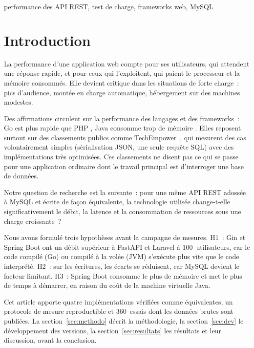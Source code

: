 \documentclass[conference,a4paper]{IEEEtran}
\begin{document}
\begin{IEEEkeywords}
performance des API REST, test de charge, frameworks web, MySQL
\end{IEEEkeywords}

\section{Introduction}
La performance d'une application web compte pour ses utilisateurs, qui
attendent une réponse rapide, et pour ceux qui l'exploitent, qui paient
le processeur et la mémoire consommés. Elle devient critique dans les
situations de forte charge~: pics d'audience, montée en charge
automatique, hébergement sur des machines modestes.

Des affirmations circulent sur la performance des langages et des
frameworks~: \og Go est plus rapide que PHP \fg, \og Java consomme
trop de mémoire \fg. Elles reposent surtout sur des classements publics
comme TechEmpower~\cite{techempower}, qui mesurent des cas
volontairement simples (sérialisation JSON, une seule requête SQL) avec
des implémentations très optimisées. Ces classements ne disent pas ce
qui se passe pour une application ordinaire dont le travail principal
est d'interroger une base de données.

Notre question de recherche est la suivante~: pour une même API REST
adossée à MySQL et écrite de façon équivalente, la technologie
utilisée change-t-elle significativement le débit, la latence et la
consommation de ressources sous une charge croissante~?

Nous avons formulé trois hypothèses avant la campagne de mesures.
H1~: Gin et Spring Boot ont un débit supérieur à FastAPI et Laravel à
100~utilisateurs, car le code compilé (Go) ou compilé à la volée (JVM)
s'exécute plus vite que le code interprété. H2~: sur les écritures, les
écarts se réduisent, car MySQL devient le facteur limitant. H3~: Spring
Boot consomme le plus de mémoire et met le plus de temps à démarrer, en
raison du coût de la machine virtuelle Java.

Cet article apporte quatre implémentations vérifiées comme
équivalentes, un protocole de mesure reproductible et 360~essais dont
les données brutes sont publiées. La section~\ref{sec:methodo} décrit la
méthodologie, la section~\ref{sec:dev} le développement des versions,
la section~\ref{sec:resultats} les résultats et leur discussion, avant
la conclusion.
\end{document}
